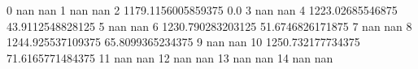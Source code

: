0 nan nan
1 nan nan
2 1179.1156005859375 0.0
3 nan nan
4 1223.02685546875 43.9112548828125
5 nan nan
6 1230.790283203125 51.6746826171875
7 nan nan
8 1244.925537109375 65.8099365234375
9 nan nan
10 1250.732177734375 71.6165771484375
11 nan nan
12 nan nan
13 nan nan
14 nan nan
